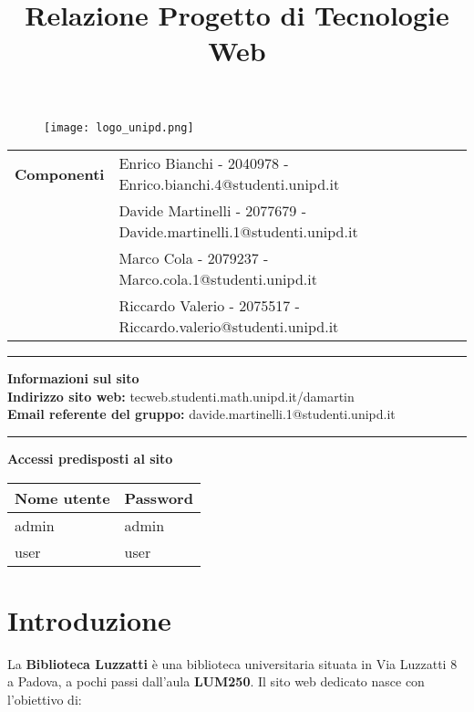 \documentclass{article}
\title{\textbf{Relazione Progetto di Tecnologie Web}}
\date{}
\makeatletter
\newcommand{\componenti}{
    & Enrico Bianchi - 2040978 - Enrico.bianchi.4@studenti.unipd.it\\
    & Davide Martinelli - 2077679 - Davide.martinelli.1@studenti.unipd.it \\
    & Marco Cola - 2079237 - Marco.cola.1@studenti.unipd.it\\
    & Riccardo Valerio - 2075517 -Riccardo.valerio@studenti.unipd.it\\
}
\makeatother
\begin{document}
\maketitle

\begin{figure}[H]
    \centering
    \texttt{[image: logo\_unipd.png]}
    \label{fig:logo_unipd}
\end{figure}

\vspace{0.5cm}

\begin{center}
\begin{tabular}{r|l}
    \textbf{Componenti} \componenti 
\end{tabular}

\vspace{1cm}
\rule{\linewidth}{0.2mm}

\vspace{0.3cm}

\textbf{Informazioni sul sito} \\
\textbf{Indirizzo sito web:} tecweb.studenti.math.unipd.it/damartin \\
\textbf{Email referente del gruppo: }davide.martinelli.1@studenti.unipd.it

\vspace{0.3cm}
\rule{\linewidth}{0.2mm}

\vspace{0.5cm}
\textbf{Accessi predisposti al sito}
\begin{table}[h]
    \centering
    \begin{tabular}{|p{5cm}|p{5cm}|}
        \hline
        \rowcolor{gray!30}
        Nome utente & Password \\
        \hline
        admin & admin   \\
        \hline
        user & user   \\
        \hline
    \end{tabular}
\end{table}

\end{center}

\newpage

\tableofcontents        %

\newpage

\section{Introduzione}
La \textbf{Biblioteca Luzzatti} è una biblioteca universitaria situata in Via Luzzatti 8 a Padova, a pochi passi dall'aula \textbf{LUM250}.  
Il sito web dedicato nasce con l'obiettivo di:
\end{document}
